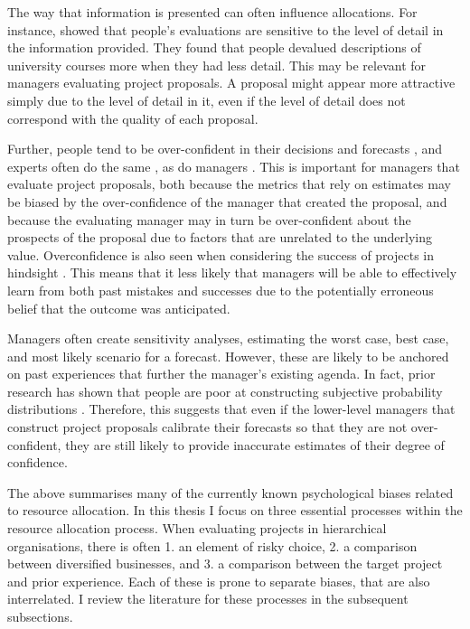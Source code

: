 \documentclass[a4paper, nobind, dvipsnames]{templates/ociamthesis}
\theoremstyle{definition}
\theoremstyle{definition}
\theoremstyle{definition}
\theoremstyle{definition}
\theoremstyle{remark}
\begin{document}
The way that information is presented can often influence allocations. For
instance, \textcite{yates1978} showed that people's evaluations are sensitive to the level
of detail in the information provided. They found that people devalued
descriptions of university courses more when they had less detail. This may be
relevant for managers evaluating project proposals. A proposal might appear more
attractive simply due to the level of detail in it, even if the level of detail
does not correspond with the quality of each proposal.

Further, people tend to be over-confident in their decisions and forecasts
\autocite{langer1975,mannes2013,soll2004,puri2007}, and experts often do the same
\autocite{mckenzie2008}, as do managers \autocite{lovallo2003,kahneman1993,baroneadesi2013}.
This is important for managers that evaluate project proposals, both because the
metrics that rely on estimates may be biased by the over-confidence of the
manager that created the proposal, and because the evaluating manager may in
turn be over-confident about the prospects of the proposal due to factors that
are unrelated to the underlying value. Overconfidence is also seen when
considering the success of projects in hindsight \autocite{bukszar1988,christensenszalanski1991}. This means that it less likely that managers will be
able to effectively learn from both past mistakes and successes due to the
potentially erroneous belief that the outcome was anticipated.

Managers often create sensitivity analyses, estimating the worst case, best
case, and most likely scenario for a forecast. However, these are likely to be
anchored on past experiences that further the manager's existing agenda. In
fact, prior research has shown that people are poor at constructing subjective
probability distributions \autocites[e.g.,][]{alpert1982,schaefer1973,staelvonholstein1971,tversky1974}. Therefore, this suggests that even if the
lower-level managers that construct project proposals calibrate their forecasts
so that they are not over-confident, they are still likely to provide inaccurate
estimates of their degree of confidence.

The above summarises many of the currently known psychological biases related to
resource allocation. In this thesis I focus on three essential processes within
the resource allocation process. When evaluating projects in hierarchical
organisations, there is often 1. an element of risky choice, 2. a comparison
between diversified businesses, and 3. a comparison between the target project
and prior experience. Each of these is prone to separate biases, that are also
interrelated. I review the literature for these processes in the subsequent
subsections.
\end{document}
